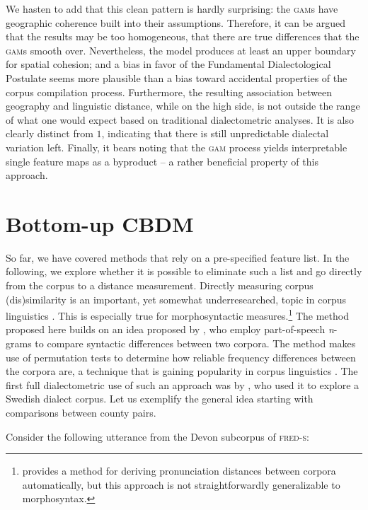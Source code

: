 \documentclass[output=paper]{LSP/langsci}
\begin{document}
We hasten to add that this clean pattern is hardly surprising: the \textsc{gam}s have geographic coherence built into their assumptions. 
Therefore, it can be argued that the results may be too homogeneous, that there are true differences that the \textsc{gam}s smooth over.
Nevertheless, the model produces at least an upper boundary for spatial cohesion; and a bias in favor of the Fundamental Dialectological Postulate seems more plausible than a bias toward accidental properties of the corpus compilation process.
Furthermore, the resulting association between geography and linguistic distance, while on the high side, is not outside the range of what one would expect based on traditional dialectometric analyses.
It is also clearly distinct from $1$, indicating that there is still unpredictable dialectal variation left.
Finally, it bears noting that the \textsc{gam} process yields interpretable single feature maps as a byproduct -- a rather beneficial property of this approach.

\section{Bottom-up CBDM} \label{bottomup}

So far, we have covered methods that rely on a pre-specified feature list.
In the following, we explore whether it is possible to eliminate such a list and go directly from the corpus to a distance measurement.
Directly measuring corpus (dis)similarity is an important, yet somewhat underresearched, topic in corpus linguistics \citep{kilgarriff_comparing_2001}.
This is especially true for morphosyntactic measures.\footnote{\citet{scherrer_recovering_2012} provides a method for deriving pronunciation distances between corpora automatically, but this approach is not straightforwardly generalizable to morphosyntax.}
The method proposed here builds on an idea proposed by \citet{nerbonne_measure_2006}, who employ part-of-speech \emph{n}-grams to compare syntactic differences between two corpora.
The method makes use of permutation tests to determine how reliable frequency differences between the corpora are, a technique that is gaining popularity in corpus linguistics \citep{lijffijt_computational_2013}.
The first full dialectometric use of such an approach was by \citet{sanders_statistical_2010}, who used it to explore a Swedish dialect corpus.
Let us exemplify the general idea starting with comparisons between county pairs.

Consider the following utterance from the Devon subcorpus of \textsc{fred-s}:
\end{document}

